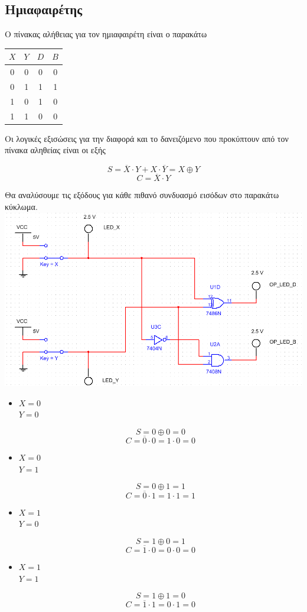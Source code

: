\documentclass{article}
\begin{document}
\subsection{Ημιαφαιρέτης}

Ο πίνακας αλήθειας για τον ημιαφαιρέτη είναι ο παρακάτω

\begin{center}
	\begin{tabular}{|c|c|c|c|}
	\hline
	$X$ & $Y$ & $D$ & $B$ \\
	\hline
	0 & 0 & 0 & 0 \\
	0 & 1 & 1 & 1 \\
	1 & 0 & 1 & 0 \\
	1 & 1 & 0 & 0 \\
	\hline
\end{tabular}
\end{center}

Οι λογικές εξισώσεις για την διαφορά και το δανειζόμενο που προκύπτουν από τον πίνακα
αληθείας είναι οι εξής

\[S = \overline{X} \cdot Y + X \cdot \overline{Y} = X \oplus Y\]
\[C = \overline{X} \cdot Y\]

Θα αναλύσουμε τις εξόδους για κάθε πιθανό συνδυασμό εισόδων στο παρακάτω κύκλωμα. \\

\includegraphics[width=\textwidth]{./res/hs00.png}

\begin{itemize}
	\item
	$X = 0$ \\
	$Y = 0$

	\[S = 0 \oplus 0 = 0\]
	\[C = \overline{0} \cdot 0 = 1 \cdot 0 = 0\]

	\item
	$X = 0$ \\
	$Y = 1$

	\[S = 0 \oplus 1 = 1\]
	\[C = \overline{0} \cdot 1 = 1 \cdot 1 = 1\]

	\item
	$X = 1$ \\
	$Y = 0$

	\[S = 1 \oplus 0 = 1\]
	\[C = \overline{1} \cdot 0 = 0 \cdot 0 = 0\]

	\item
	$X = 1$ \\
	$Y = 1$

	\[S = 1 \oplus 1 = 0\]
	\[C = \overline{1} \cdot 1 = 0 \cdot 1 = 0\]
\end{itemize}
\end{document}
